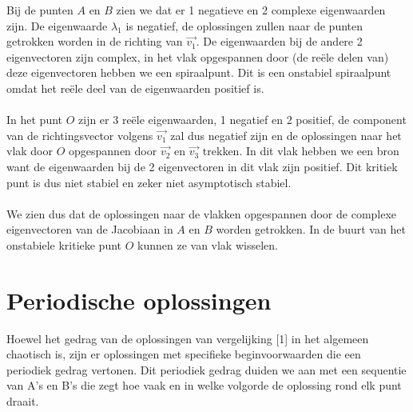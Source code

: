 \documentclass[12pt, a4paper]{article}
\theoremstyle{definition}
\begin{document}
Bij de punten $A$ en $B$ zien we dat er 1 negatieve en 2 complexe eigenwaarden zijn. De eigenwaarde $\lambda_1$ is negatief, de oplossingen zullen naar de punten getrokken worden in de richting van $\Vec{v_1}$. De eigenwaarden bij de andere 2 eigenvectoren zijn complex, in het vlak opgespannen door (de reële delen van) deze eigenvectoren hebben we een spiraalpunt. Dit is een onstabiel spiraalpunt omdat het reële deel van de eigenwaarden positief is. \\
\\
In het punt $O$ zijn er 3 reële eigenwaarden, 1 negatief en 2 positief, de component van de richtingsvector volgens $\Vec{v_1}$ zal dus negatief zijn en de oplossingen naar het vlak door $O$ opgespannen door $\Vec{v_2}$ en $\Vec{v_3}$ trekken. In dit vlak hebben we een bron want de eigenwaarden bij de 2 eigenvectoren in dit vlak zijn positief. Dit kritiek punt is dus niet stabiel en zeker niet asymptotisch stabiel.\\
\\
We zien dus dat de oplossingen naar de vlakken opgespannen door de complexe eigenvectoren van de Jacobiaan in $A$ en $B$ worden getrokken. In de buurt van het onstabiele kritieke punt $O$ kunnen ze van vlak wisselen.



\section{Periodische oplossingen}
Hoewel het gedrag van de oplossingen van vergelijking [1] in het algemeen chaotisch is, zijn er oplossingen met specifieke beginvoorwaarden die een periodiek gedrag vertonen. Dit periodiek gedrag duiden we aan met een sequentie van A's en B's die zegt hoe vaak en in welke volgorde de oplossing rond elk punt draait.
\end{document}
